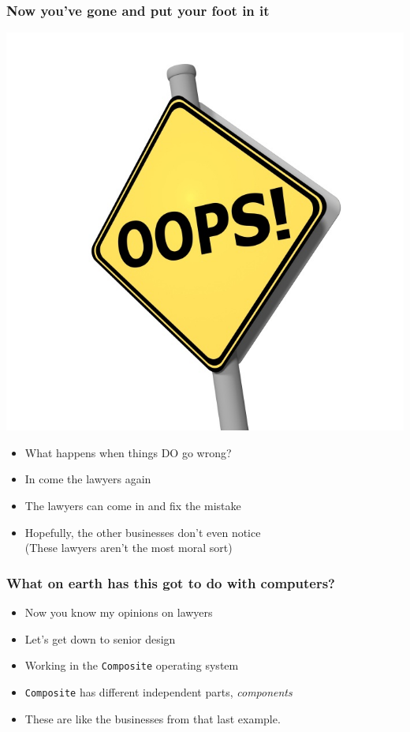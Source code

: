 \documentclass[bigger]{beamer}
\begin{document}
\begin{frame}
\frametitle{Now you've gone and put your foot in it}
\label{sec-4}

\includegraphics[scale=0.1]{../pictures/oops.jpg}
\begin{itemize}
\item What happens when things DO go wrong?
\end{itemize}
\pause
\begin{itemize}
\item In come the lawyers again
\item The lawyers can come in and fix the mistake
\item Hopefully, the other businesses don't even notice \\ (These lawyers aren't the most moral sort)
\end{itemize}
\end{frame}
\begin{frame}[fragile]
\frametitle{What on earth has this got to do with computers?}
\label{sec-5}

\begin{itemize}
\item Now you know my opinions on lawyers
\item Let's get down to senior design
\item Working in the \verb~Composite~ operating system
\item \verb~Composite~ has different independent parts, \emph{components}
\item These are like the businesses from that last example.
\end{itemize}
\end{frame}
\end{document}
